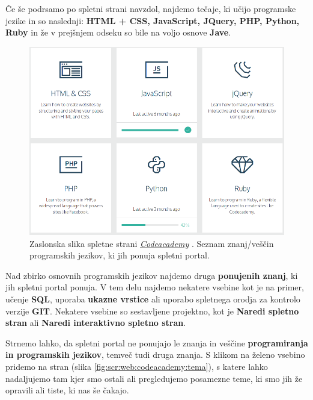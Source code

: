 Če še podrsamo po spletni strani navzdol, najdemo tečaje, ki učijo
programske jezike in so naslednji: \textbf{HTML + CSS, JavaScript,
  JQuery, PHP, Python, Ruby} in že v prejšnjem odseku so bile na voljo
osnove \textbf{Jave}.

\begin{figure}[h!]
  \centering
    \includegraphics [width=0.65\linewidth, keepaspectratio =
    1] {./images/sc_web/codeacademy_vescine_02.png}
    \caption{Zaslonska slika spletne strani
      \emph{\href{https://www.codecademy.com/}{Codeacademy}}
      \cite{web:codeacademy}. Seznam znanj/veščin programskih jezikov,
      ki jih ponuja spletni portal.}
    \label{fig:scr:web:codeacademy:vescine-prog}
\end{figure}

Nad zbirko osnovnih programskih jezikov najdemo druga
\textbf{ponujenih znanj}, ki jih spletni portal ponuja. V tem delu
najdemo nekatere vsebine kot je na primer, učenje \textbf{SQL},
uporaba \textbf{ukazne vrstice} ali uporabo spletnega orodja za
kontrolo verzije \textbf{GIT}. Nekatere vsebine so sestavljene
projektno, kot je \textbf{Naredi spletno stran} ali \textbf{Naredi
  interaktivno spletno stran}.


Strnemo lahko, da spletni portal ne ponujajo le znanja in veščine
\textbf{programiranja in programskih jezikov}, temveč tudi druga
znanja. S klikom na želeno vsebino pridemo na stran (slika
\ref{fig:scr:web:codeacademy:tema}), s katere lahko nadaljujemo tam
kjer smo ostali ali pregledujemo posamezne teme, ki smo jih že
opravili ali tiste, ki nas še čakajo.

